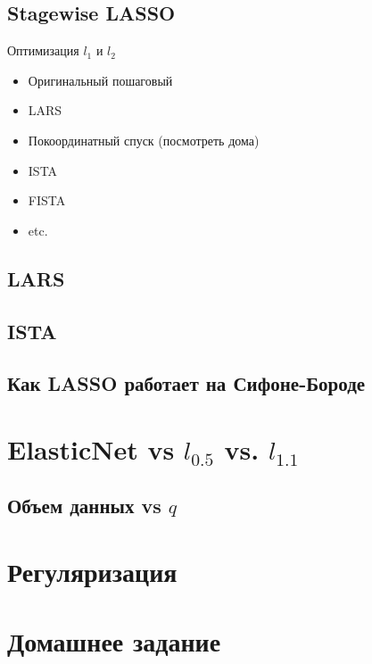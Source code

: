 \documentclass[14pt, fleqn, xcolor={dvipsnames, table}]{beamer}
\begin{document}
\subsection{Stagewise LASSO}
\begin{frame}{Оптимизация $l_1$ и $l_2$}
\begin{itemize}
\small
  \item Оригинальный пошаговый
  \item LARS
  \item Покоординатный спуск (посмотреть дома)
  \item ISTA
  \item FISTA
  \item etc.
\end{itemize}
\end{frame}

\subsection{LARS}
\subsection{ISTA}
\subsection{Как LASSO работает на Сифоне-Бороде}
\section{ElasticNet vs $l_{0.5}$ vs. $l_{1.1}$}
\subsection{Объем данных vs $q$}
\section{Регуляризация}
\section{Домашнее задание}
\end{document}
